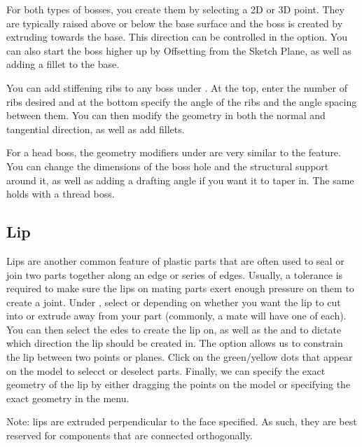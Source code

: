 For both types of bosses, you create them by selecting a 2D or 3D point. They are typically raised above or below the base surface and the boss is created by extruding towards the base. This direction can be controlled in the  option. You can also start the boss higher up by Offsetting from the Sketch Plane, as well as adding a fillet to the base.

You can add stiffening ribs to any boss under . At the top, enter the number of ribs desired and at the bottom specify the angle of the ribs and the angle spacing between them. You can then modify the geometry in both the normal and tangential direction, as well as add fillets.

For a head boss, the geometry modifiers under  are very similar to the  feature. You can change the dimensions of the boss hole and the structural support around it, as well as adding a drafting angle if you want it to taper in. The same holds with a thread boss.

\subsection{Lip}



Lips are another common feature of plastic parts that are often used to seal or join two parts together along an edge or series of edges. Usually, a tolerance is required to make sure the lips on mating parts exert enough pressure on them to create a joint. Under , select  or  depending on whether you want the lip to cut into or extrude away from your part (commonly, a mate will have one of each). You can then select the edes to create the lip on, as well as the  and  to dictate which direction the lip should be created in. The  option allows us to constrain the lip between two points or planes. Click on the green/yellow dots that appear on the model to selecct or deselect parts. Finally, we can specify the exact geometry of the lip by either dragging the points on the model or specifying the exact geometry in the menu. 

Note: lips are extruded perpendicular to the face specified. As such, they are best reserved for components that are connected orthogonally.

